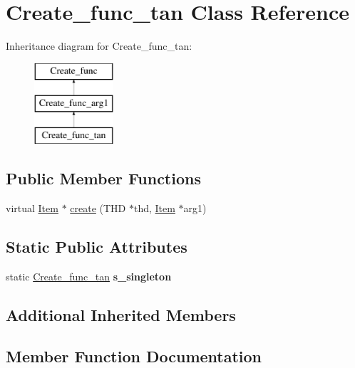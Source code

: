 \hypertarget{classCreate__func__tan}{}\section{Create\+\_\+func\+\_\+tan Class Reference}
\label{classCreate__func__tan}
Inheritance diagram for Create\+\_\+func\+\_\+tan\+:\begin{figure}[H]
\begin{center}
\leavevmode
\includegraphics[height=3.000000cm]{classCreate__func__tan}
\end{center}
\end{figure}
\subsection*{Public Member Functions}
\begin{DoxyCompactItemize}
\item 
virtual \mbox{\hyperlink{classItem}{Item}} $\ast$ \mbox{\hyperlink{classCreate__func__tan_abde6a2f7ba4845db4e7295901b6f20f9}{create}} (T\+HD $\ast$thd, \mbox{\hyperlink{classItem}{Item}} $\ast$arg1)
\end{DoxyCompactItemize}
\subsection*{Static Public Attributes}
\begin{DoxyCompactItemize}
\item 
\mbox{\label{classCreate__func__tan_a9ef40816c93c70416e5585beccb0aa26}} 
static \mbox{\hyperlink{classCreate__func__tan}{Create\+\_\+func\+\_\+tan}} {\bfseries s\+\_\+singleton}
\end{DoxyCompactItemize}
\subsection*{Additional Inherited Members}


\subsection{Member Function Documentation}
\mbox{\label{classCreate__func__tan_abde6a2f7ba4845db4e7295901b6f20f9}} 
